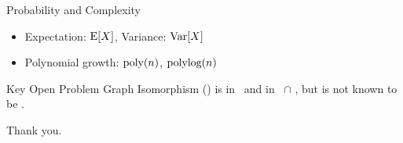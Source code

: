 \documentclass{beamer}
\begin{document}
\begin{frame}{Probability and Complexity}
    \begin{itemize}
        \item Expectation: $\mathrm{E}[X]$, \quad Variance: $\mathrm{Var}[X]$
        \item Polynomial growth: $\text{poly}(n)$, $\text{polylog}(n)$
    \end{itemize}

    \pause

    \begin{alertblock}{Key Open Problem}
        Graph Isomorphism (\GIp) is in \NP\ and in \AM\ $\cap$ \SZK,
        but is not known to be \NPc.
    \end{alertblock}
\end{frame}

\begin{frame}
    \centering
    \Large Thank you.
\end{frame}
\end{document}
